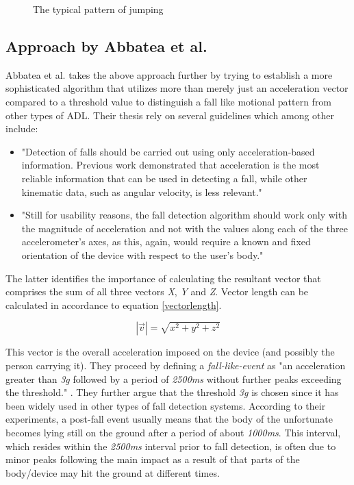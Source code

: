 \documentclass[12pt, a4paper, onecolumn]{article}
\begin{document}
	\begin{figure}[H]
		\centering
		\caption{The typical pattern of jumping}%
		\label{fig:Pattern-Jumping}%
	\end{figure}
	
	\subsection{Approach by Abbatea et al.}
	Abbatea et al. takes the above approach further by trying to establish a more sophisticated algorithm that utilizes more than merely just an acceleration vector compared to a threshold value to distinguish a fall like motional pattern from other types of ADL. Their thesis rely on several guidelines which among other include: 
	\begin{itemize} 
		\item "Detection of falls should be carried out using only acceleration-based information. Previous work demonstrated that acceleration is the most reliable information that can be used in detecting a fall, while other kinematic data, such as angular velocity, is less relevant." \cite[p~3]{piza_uni}
		
		\item "Still for usability reasons, the fall detection algorithm should work only with the magnitude of acceleration and not with the values along each of the three accelerometer’s axes, as this, again, would require a known and fixed orientation of the device with respect to the user’s body." \cite[p~3]{piza_uni}
	\end{itemize}
	
	The latter identifies the importance of calculating the resultant vector that comprises the sum of all three vectors \textit{X}, \textit{Y} and \textit{Z}. Vector length can be calculated in accordance to equation \ref{vectorlength}.
	
	\begin{equation}
	\label{vectorlength}
	|\vec{v}|=\sqrt{x^2+y^2+z^2}
	\end{equation}
	
	This vector is the overall acceleration imposed on the device (and possibly the person carrying it). They proceed by defining a \textit{fall-like-event} as "an acceleration greater than \textit{3g} followed by a period of \textit{2500ms} without further peaks exceeding the threshold." \cite[p~5]{piza_uni}. They further argue that the threshold \textit{3g} is chosen since it has been widely used in other types of fall detection systems. According to their experiments, a post-fall event usually means that the body of the unfortunate becomes lying still on the ground after a period of about \textit{1000ms}. This interval, which resides within the \textit{2500ms} interval prior to fall detection, is often due to minor peaks following the main impact as a result of that parts of the body/device may hit the ground at different times. 
	
\end{document}
